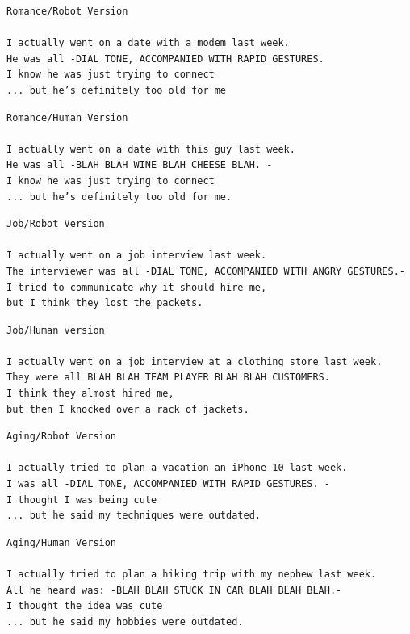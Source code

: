 \documentclass[onecolumn, draftclsnofoot,10pt, compsoc]{IEEEtran}
\begin{document}
\begin{lstlisting}
Romance/Robot Version

I actually went on a date with a modem last week.
He was all -DIAL TONE, ACCOMPANIED WITH RAPID GESTURES.
I know he was just trying to connect
... but he’s definitely too old for me
\end{lstlisting}

\begin{lstlisting}
Romance/Human Version

I actually went on a date with this guy last week.
He was all -BLAH BLAH WINE BLAH CHEESE BLAH. -
I know he was just trying to connect
... but he’s definitely too old for me.
\end{lstlisting}

\begin{lstlisting}
Job/Robot Version

I actually went on a job interview last week.
The interviewer was all -DIAL TONE, ACCOMPANIED WITH ANGRY GESTURES.-
I tried to communicate why it should hire me,
but I think they lost the packets.
\end{lstlisting}

\begin{lstlisting}
Job/Human version

I actually went on a job interview at a clothing store last week.
They were all BLAH BLAH TEAM PLAYER BLAH BLAH CUSTOMERS.
I think they almost hired me,
but then I knocked over a rack of jackets.
\end{lstlisting}

\begin{lstlisting}
Aging/Robot Version

I actually tried to plan a vacation an iPhone 10 last week.
I was all -DIAL TONE, ACCOMPANIED WITH RAPID GESTURES. -
I thought I was being cute
... but he said my techniques were outdated.
\end{lstlisting}

\begin{lstlisting}
Aging/Human Version

I actually tried to plan a hiking trip with my nephew last week.
All he heard was: -BLAH BLAH STUCK IN CAR BLAH BLAH BLAH.-
I thought the idea was cute
... but he said my hobbies were outdated.

\end{lstlisting}
\end{document}
